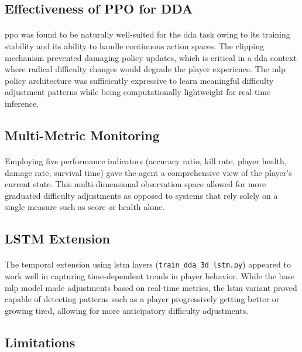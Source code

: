 \subsection{Effectiveness of PPO for DDA}
\paragraph{} \ac{ppo} was found to be naturally well-suited for the \ac{dda} task owing to its training stability and its ability to handle continuous action spaces. The clipping mechanism prevented damaging policy updates, which is critical in a \ac{dda} context where radical difficulty changes would degrade the player experience. The \ac{mlp} policy architecture was sufficiently expressive to learn meaningful difficulty adjustment patterns while being computationally lightweight for real-time inference.

\subsection{Multi-Metric Monitoring}
\paragraph{} Employing five performance indicators (accuracy ratio, kill rate, player health, damage rate, survival time) gave the agent a comprehensive view of the player's current state. This multi-dimensional observation space allowed for more graduated difficulty adjustments as opposed to systems that rely solely on a single measure such as score or health alone.

\subsection{LSTM Extension}
\paragraph{} The temporal extension using \ac{lstm} layers (\texttt{train\_dda\_3d\_lstm.py}) appeared to work well in capturing time-dependent trends in player behavior. While the base \ac{mlp} model made adjustments based on real-time metrics, the \ac{lstm} variant proved capable of detecting patterns such as a player progressively getting better or growing tired, allowing for more anticipatory difficulty adjustments.

\subsection{Limitations}
